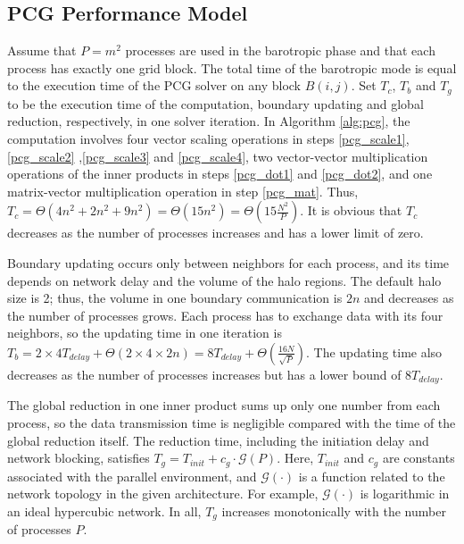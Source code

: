 \documentclass{sig-alternate}
\begin{document}
\subsection{PCG Performance Model}
Assume that $P=m^2$ processes are used in the barotropic phase and that each process has exactly one grid block. The total time of the barotropic mode is equal to the execution time of the PCG solver on any block $B(i,j)$. Set $T_c$, $T_b$ and $T_g$ to be the execution time of the computation, boundary updating and global reduction, respectively, in one solver iteration.
In Algorithm \ref{alg:pcg}, the computation involves four vector scaling operations in steps \ref{pcg_scale1},  \ref{pcg_scale2} ,\ref{pcg_scale3} and  \ref{pcg_scale4}, two vector-vector multiplication operations of the inner products in steps \ref{pcg_dot1} and \ref{pcg_dot2}, and one matrix-vector multiplication operation in step \ref{pcg_mat}. Thus, $T_c= \Theta (4 n^2 +2n^2+ 9n^2) = \Theta (15n^2) =\Theta(15\frac{N^2}{P})$. It is obvious that $T_c$ decreases as the number of processes increases and has a lower limit of zero.

Boundary updating occurs only between neighbors for each process, and its time depends on network delay and the volume of the halo regions. The default halo size is 2; thus, the volume in one boundary communication is $2n$ and decreases as the number of processes grows. Each process has to exchange data with its four neighbors, so the updating time in one iteration is $T_b =2\times4T_{delay} +\Theta (2\times4\times 2n)=8T_{delay} +\Theta (\frac{16N}{\sqrt{P}})$. The updating time also decreases as the number of processes increases but has a lower bound of $8T_{delay}$.

The global reduction in one inner product sums up only one number from each process, so the data transmission time is negligible compared with the time of the global reduction itself. The reduction time, including the initiation delay and network blocking, satisfies $T_g= T_{init}+ c_g\cdot \mathcal{G}(P)$. Here, $T_{init}$ and $c_g$ are constants associated with the parallel environment, and $\mathcal{G}(\cdot)$ is a function related to the network topology in the given architecture. For example, $\mathcal{G}(\cdot)$ is logarithmic in an ideal hypercubic network. In all, $T_g$ increases monotonically with the number of processes $P$.
\end{document}
